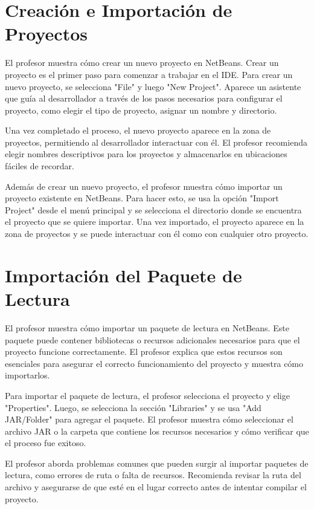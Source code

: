 \documentclass[a4paper]{report}
\begin{document}
\section{Creación e Importación de Proyectos}

El profesor muestra cómo crear un nuevo proyecto en NetBeans. Crear un proyecto es el primer paso para comenzar a trabajar en el IDE. Para crear un nuevo proyecto, se selecciona "File" y luego "New Project". Aparece un asistente que guía al desarrollador a través de los pasos necesarios para configurar el proyecto, como elegir el tipo de proyecto, asignar un nombre y directorio.



Una vez completado el proceso, el nuevo proyecto aparece en la zona de proyectos, permitiendo al desarrollador interactuar con él. El profesor recomienda elegir nombres descriptivos para los proyectos y almacenarlos en ubicaciones fáciles de recordar.



Además de crear un nuevo proyecto, el profesor muestra cómo importar un proyecto existente en NetBeans. Para hacer esto, se usa la opción "Import Project" desde el menú principal y se selecciona el directorio donde se encuentra el proyecto que se quiere importar. Una vez importado, el proyecto aparece en la zona de proyectos y se puede interactuar con él como con cualquier otro proyecto.



\section{Importación del Paquete de Lectura}

El profesor muestra cómo importar un paquete de lectura en NetBeans. Este paquete puede contener bibliotecas o recursos adicionales necesarios para que el proyecto funcione correctamente. El profesor explica que estos recursos son esenciales para asegurar el correcto funcionamiento del proyecto y muestra cómo importarlos.



Para importar el paquete de lectura, el profesor selecciona el proyecto y elige "Properties". Luego, se selecciona la sección "Libraries" y se usa "Add JAR/Folder" para agregar el paquete. El profesor muestra cómo seleccionar el archivo JAR o la carpeta que contiene los recursos necesarios y cómo verificar que el proceso fue exitoso.



El profesor aborda problemas comunes que pueden surgir al importar paquetes de lectura, como errores de ruta o falta de recursos. Recomienda revisar la ruta del archivo y asegurarse de que esté en el lugar correcto antes de intentar compilar el proyecto.
\end{document}
